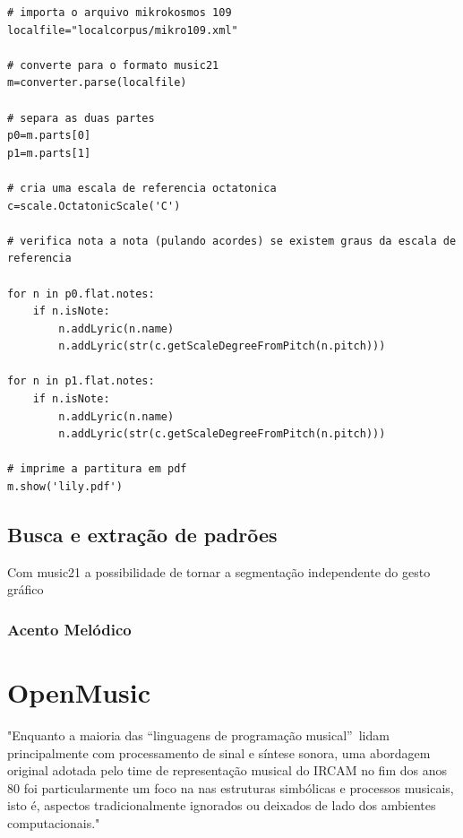 \documentclass[
	12pt,				%
	openright,			%
	twoside,			%
	a4paper,			%
	english,			%
	french,				%
	spanish,			%
	brazil				%
	]{abntex2}
\begin{document}
\begin{lstlisting}
# importa o arquivo mikrokosmos 109
localfile="localcorpus/mikro109.xml"

# converte para o formato music21
m=converter.parse(localfile)

# separa as duas partes
p0=m.parts[0]
p1=m.parts[1]

# cria uma escala de referencia octatonica
c=scale.OctatonicScale('C')

# verifica nota a nota (pulando acordes) se existem graus da escala de referencia 

for n in p0.flat.notes:
	if n.isNote:
		n.addLyric(n.name)
		n.addLyric(str(c.getScaleDegreeFromPitch(n.pitch)))

for n in p1.flat.notes:
	if n.isNote:
		n.addLyric(n.name)
		n.addLyric(str(c.getScaleDegreeFromPitch(n.pitch)))			
			
# imprime a partitura em pdf
m.show('lily.pdf')		
\end{lstlisting}












\subsection{Busca e extração de padrões}

Com music21 a possibilidade de tornar a segmentação independente do gesto gráfico


\subsubsection{Acento Melódico}



\pagebreak
\section{OpenMusic}

\begin{citacao}
"Enquanto a maioria das “linguagens de programação musical”\ lidam principalmente com processamento de sinal e síntese sonora, uma abordagem original adotada pelo time de representação musical do IRCAM no fim dos anos 80 foi
particularmente um foco na nas estruturas simbólicas e processos musicais, isto é, aspectos tradicionalmente
ignorados ou deixados de lado dos ambientes computacionais."\cite[ p.743]{bresson2011openmusic}
\end{citacao}
\end{document}
